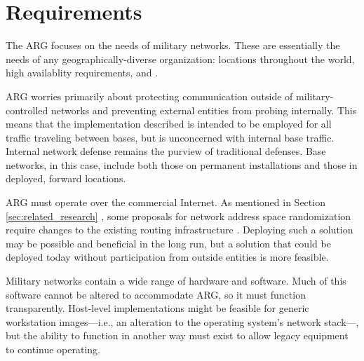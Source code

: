 \section{Requirements}
\par The \ac{ARG} focuses on the needs of military networks. These are essentially the needs of any geographically-diverse organization: locations throughout the world, high availablity requirements, and . 

\par ARG worries primarily about protecting communication outside of military-controlled networks and preventing external entities from probing internally. This means that the implementation described is intended to be employed for all traffic traveling between bases, but is unconcerned with internal base traffic. Internal network defense remains the purview of traditional defenses. Base networks, in this case, include both those on permanent installations and those in deployed, forward locations. 

\par ARG must operate over the commercial Internet. As mentioned in Section \ref{sec:related_research} , some proposals for network address space randomization require changes to the existing routing infrastructure \cite{CONTRA}. Deploying such a solution may be possible and beneficial in the long run, but a solution that could be deployed today without participation from outside entities is more feasible.


\par Military networks contain a wide range of hardware and software. Much of this software cannot be altered to accommodate ARG, so it must function transparently. Host-level implementations might be feasible for generic workstation images---i.e., an alteration to the operating system's network stack---, but the ability to function in another way must exist to allow legacy equipment to continue operating.

